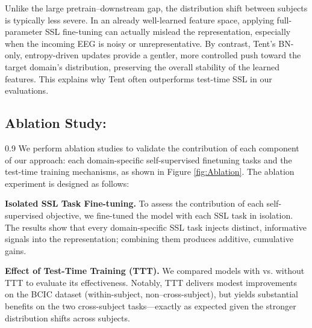 \documentclass{article} %
\begin{document}
Unlike the large pretrain–downstream gap, the distribution shift between subjects is typically less severe. In an already well-learned feature space, applying full-parameter SSL fine-tuning can actually mislead the representation, especially when the incoming EEG is noisy or unrepresentative. By contrast, Tent’s BN-only, entropy-driven updates provide a gentler, more controlled push toward the target domain’s distribution, preserving the overall stability of the learned features. This explains why Tent often outperforms test-time SSL in our evaluations.



\subsection{Ablation Study:}
\begin{spacing}{0.9}
We perform ablation studies to validate the contribution of each component of our approach: each domain-specific self-supervised finetuning tasks and the test-time training mechanisms, as shown in Figure \ref{fig:Ablation}. The ablation experiment is designed as follows:



\textbf{Isolated SSL Task Fine-tuning.} To assess the contribution of each self-supervised objective, we fine-tuned the model with each SSL task in isolation. The results show that every domain-specific SSL task injects distinct, informative signals into the representation; combining them produces additive, cumulative gains.

\textbf{Effect of Test-Time Training (TTT).} We compared models with vs. without TTT to evaluate its effectiveness. Notably, TTT delivers modest improvements on the BCIC dataset (within-subject, non–cross-subject), but yields substantial benefits on the two cross-subject tasks—exactly as expected given the stronger distribution shifts across subjects.
\end{spacing}
\end{document}
